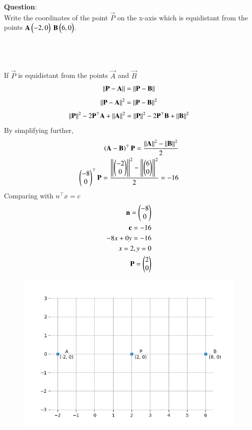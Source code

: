 \documentclass[journal]{IEEEtran}
\begin{document}
\textbf{Question}:\\
Write the coordinates of the point $\vec{P}$ on the x-axis which is equidistant from the points $\mathbf{A}\begin{pmatrix}-2,0\end{pmatrix}$ $\mathbf{B}\begin{pmatrix}6,0\end{pmatrix}$.\hfill{}\\
\\ \solution \\
    \begin{table}[h!]    
      \centering
      
      \caption{}
    \end{table}\\
If $\vec{P}$ is equidistant from the points $\vec{A}$ and $\vec{B}$
    \begin{align}
        \left\vert\left\vert\mathbf{P}-\mathbf{A}\right\vert\right\vert = \left\vert\left\vert\mathbf{P}-\mathbf{B}\right\vert\right\vert \label{eq1.1.9.17.1}
    \end{align}
     \begin{align}
        \left\vert\left\vert\mathbf{P}-\mathbf{A}\right\vert\right\vert^2 = \left\vert\left\vert\mathbf{P}-\mathbf{B}\right\vert\right\vert^2\label{eq1.1.9.17.2}
    \end{align}
    \begin{align}
    	\left\vert\left\vert\mathbf{P}\right\vert\right\vert^2 - 2\mathbf{P}^\top \mathbf{A} + \left\vert\left\vert\mathbf{A}\right\vert\right\vert^2 = \left\vert\left\vert\mathbf{P}\right\vert\right\vert^2 - 2\mathbf{P}^\top\mathbf{B} + \left\vert\left\vert\mathbf{B}\right\vert\right\vert^2\label{eq1.1.9.17.3}
    \end{align}
By simplifying further,
    \begin{align}
    	\left(\mathbf{A}-\mathbf{B}\right)^\top \mathbf{P} = \frac{\left\vert\left\vert\mathbf{A}\right\vert\right\vert^2-\left\vert\left\vert\mathbf{B}\right\vert\right\vert^2}{2} \\
    	\begin{pmatrix}-8 \\ 0\end{pmatrix}^\top \mathbf{P} = \frac{\left\vert\left\vert\begin{pmatrix}-2 \\ 0\end{pmatrix}\right\vert\right\vert^2-\left\vert\left\vert\begin{pmatrix}6 \\ 0\end{pmatrix}\right\vert\right\vert^2}{2} = -16\label{eq1.1.9.17.4}
    \end{align}
Comparing with $n^\top x = c$
    \begin{align}
    	\mathbf{n} = \begin{pmatrix}-8 \\ 0\end{pmatrix}\\ \label{eq1.1.8.28.5}
	    \mathbf{c} = -16\\
     -8x+0y=-16\\
     x=2,y=0\\
     \mathbf{P}=\begin{pmatrix}2 \\ 0\end{pmatrix}
    \end{align}
    \begin{figure}[h]
        \centering
       \includegraphics[width=\linewidth]{figs/fig1.png}
       \caption{}
       \label{graph}
    \end{figure}
\end{document}
